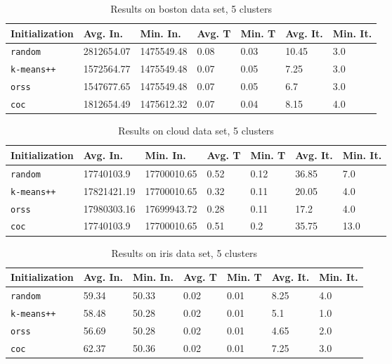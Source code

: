 \documentclass[twoside, 11pt]{article}
\begin{document}
		\begin{table}[p]
			\begin{center}
				\begin{tabular}{|l|l|l|l|l|l|l|}
					\hline
					Initialization & Avg. In. & Min. In. & Avg. T & Min. T & Avg. It. & Min. It.\\\hline
					\texttt{random} & 2812654.07 & 1475549.48 & 0.08 & 0.03 & 10.45 & 3.0\\\hline
					\texttt{k-means++} & 1572564.77 & 1475549.48 & 0.07 & 0.05 & 7.25 & 3.0\\\hline
					\texttt{orss} & 1547677.65 & 1475549.48 & 0.07 & 0.05 & 6.7 & 3.0\\\hline
					\texttt{coc} & 1812654.49 & 1475612.32 & 0.07 & 0.04 & 8.15 & 4.0\\\hline
				\end{tabular}
				\caption{Results on boston data set, 5 clusters}
				\label{tbl:boston5}
			\end{center}
		\end{table}
		
		\begin{table}[p]
			\begin{center}
				\begin{tabular}{|l|l|l|l|l|l|l|}
					\hline
					Initialization & Avg. In. & Min. In. & Avg. T & Min. T & Avg. It. & Min. It.\\\hline
					\texttt{random} & 17740103.9 & 17700010.65 & 0.52 & 0.12 & 36.85 & 7.0\\\hline
					\texttt{k-means++} & 17821421.19 & 17700010.65 & 0.32 & 0.11 & 20.05 & 4.0\\\hline
					\texttt{orss} & 17980303.16 & 17699943.72 & 0.28 & 0.11 & 17.2 & 4.0\\\hline
					\texttt{coc} & 17740103.9 & 17700010.65 & 0.51 & 0.2 & 35.75 & 13.0\\\hline
				\end{tabular}
				\caption{Results on cloud data set, 5 clusters}
				\label{tbl:cloud5}
			\end{center}
		\end{table}
		
		\begin{table}[p]
			\begin{center}
				\begin{tabular}{|l|l|l|l|l|l|l|}
					\hline
					Initialization & Avg. In. & Min. In. & Avg. T & Min. T & Avg. It. & Min. It.\\\hline
					\texttt{random} & 59.34 & 50.33 & 0.02 & 0.01 & 8.25 & 4.0\\\hline
					\texttt{k-means++} & 58.48 & 50.28 & 0.02 & 0.01 & 5.1 & 1.0\\\hline
					\texttt{orss} & 56.69 & 50.28 & 0.02 & 0.01 & 4.65 & 2.0\\\hline
					\texttt{coc} & 62.37 & 50.36 & 0.02 & 0.01 & 7.25 & 3.0\\\hline
				\end{tabular}
				\caption{Results on iris data set, 5 clusters}
				\label{tbl:iris5}
			\end{center}
		\end{table}
		
\end{document}
